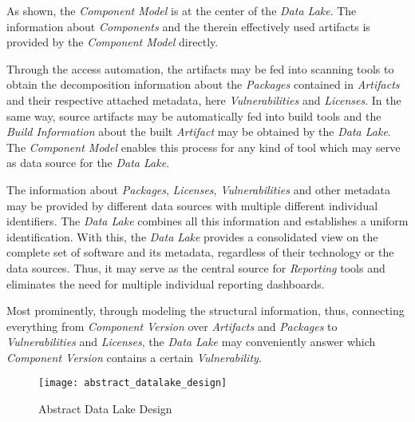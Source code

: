 As shown, the \emph{Component Model} is at the center of the \emph{Data Lake}. The information about \emph{Components} and the therein effectively used artifacts is provided by the \emph{Component Model} directly.\par
Through the access automation, the artifacts may be fed into scanning tools to obtain the  decomposition information about the \emph{Packages} contained in \emph{Artifacts} and their respective attached metadata, here \emph{Vulnerabilities} and \emph{Licenses}. In the same way, source artifacts may be automatically fed into build tools and the \emph{Build Information} about the built \emph{Artifact} may be obtained by the \emph{Data Lake}. The \emph{Component Model} enables this process for any kind of tool which may serve as data source for the \emph{Data Lake}.\par
The information about \emph{Packages}, \emph{Licenses}, \emph{Vulnerabilities} and other metadata may be provided by different data sources with multiple different individual identifiers. The \emph{Data Lake} combines all this information and establishes a uniform identification. With this, the \emph{Data Lake} provides a consolidated view on the complete set of software and its metadata, regardless of their technology or the data sources. Thus, it may serve as the central source for \emph{Reporting} tools and eliminates the need for multiple individual reporting dashboards.\par
Most prominently, through modeling the structural information, thus, connecting everything from \emph{Component Version} over \emph{Artifacts} and \emph{Packages} to \emph{Vulnerabilities} and \emph{Licenses}, the \emph{Data Lake} may conveniently answer which \emph{Component Version} contains a certain \emph{Vulnerability}. 

\begin{figure}[H]
	\centering
	\texttt{[image: abstract\_datalake\_design]}
	\caption[Abstract Data Lake Design]{Abstract Data Lake Design }
	\label{fig:AbstractDataLakeDesign}
\end{figure}


